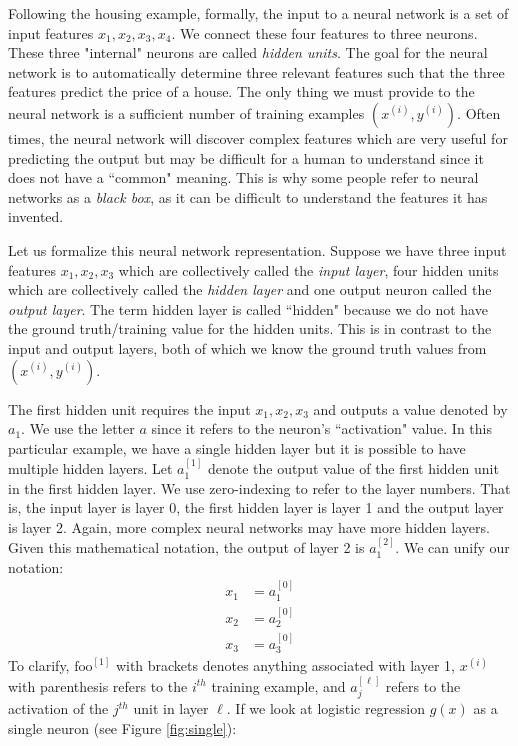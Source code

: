 \documentclass{article}
\numberwithin{equation}{section}
\begin{document}
Following the housing example, formally, the input to a neural network is a set of input features $x_1, x_2, x_3, x_4$. We connect these four features to three neurons. These three "internal" neurons are called \textit{hidden units}. The goal for the neural network is to automatically determine three relevant features such that the three features predict the price of a house. The only thing we must provide to the neural network is a sufficient number of training examples $(x^{(i)}, y^{(i)})$. Often times, the neural network will discover complex features which are very useful for predicting the output but may be difficult for a human to understand since it does not have a ``common" meaning. This is why some people refer to neural networks as a \textit{black box}, as it can be difficult to understand the features it has invented.

Let us formalize this neural network representation. Suppose we have three input features $x_1, x_2, x_3$ which are collectively called the \textit{input layer}, four hidden units which are collectively called the \textit{hidden layer} and one output neuron called the \textit{output layer}. The term hidden layer is called ``hidden" because we do not have the ground truth/training value for the hidden units. This is in contrast to the input and output layers, both of which we know the ground truth values from $(x^{(i)}, y^{(i)})$.

The first hidden unit requires the input $x_1, x_2, x_3$ and outputs a value denoted by $a_1$. We use the letter $a$ since it refers to the neuron's ``activation" value. In this particular example, we have a single hidden layer but it is possible to have multiple hidden layers. Let $a_1^{[1]}$ denote the output value of the first hidden unit in the first hidden layer. We use zero-indexing to refer to the layer numbers. That is, the input layer is layer 0, the first hidden layer is layer 1 and the output layer is layer 2. Again, more complex neural networks may have more hidden layers. Given this mathematical notation, the output of layer 2 is $a^{[2]}_1$. We can unify our notation:
\begin{align}
x_1 &= a^{[0]}_1 \\
x_2 &= a^{[0]}_2 \\
x_3 &= a^{[0]}_3
\end{align}
To clarify, $\textrm{foo}^{[1]}$ with brackets denotes anything associated with layer 1, $x^{(i)}$ with parenthesis refers to the $i^{th}$ training example, and $a^{[\ell]}_j$ refers to the activation of the $j^{th}$ unit in layer $\ell$. If we look at logistic regression $g(x)$ as a single neuron (see Figure \ref{fig:single}):
\end{document}
